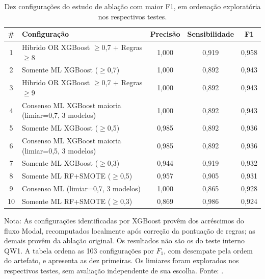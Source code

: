 \begin{table}[htbp]
\centering
\caption{Dez configurações do estudo de ablação com maior F1, em ordenação exploratória nos respectivos testes.}
\label{tab:ablation-top10}
\small
\begin{tabular}{cp{8cm}ccc}
\toprule
\# & Configuração & Precisão & Sensibilidade & F1 \\
\midrule
1 & Híbrido OR XGBoost $\geq$0,7 + Regras$\geq$8 & 1,000 & 0,919 & 0,958 \\
2 & Somente ML XGBoost ($\geq$0,7) & 1,000 & 0,892 & 0,943 \\
3 & Híbrido OR XGBoost $\geq$0,7 + Regras$\geq$9 & 1,000 & 0,892 & 0,943 \\
4 & Consenso ML XGBoost maioria (limiar=0,7, 3 modelos) & 1,000 & 0,892 & 0,943 \\
5 & Somente ML XGBoost ($\geq$0,5) & 0,985 & 0,892 & 0,936 \\
6 & Consenso ML XGBoost maioria (limiar=0,5, 3 modelos) & 0,985 & 0,892 & 0,936 \\
7 & Somente ML XGBoost ($\geq$0,3) & 0,944 & 0,919 & 0,932 \\
8 & Somente ML RF+SMOTE ($\geq$0,5) & 0,957 & 0,905 & 0,931 \\
9 & Consenso ML (limiar=0,7, 3 modelos) & 1,000 & 0,865 & 0,928 \\
10 & Somente ML RF+SMOTE ($\geq$0,3) & 0,869 & 0,986 & 0,924 \\
\bottomrule
\end{tabular}
\vspace{2pt}
\par\small Nota: As configurações identificadas por XGBoost provêm dos acréscimos do fluxo Modal, recomputados localmente após correção da pontuação de regras; as demais provêm da ablação original. Os resultados não são os do teste interno QW1. A tabela ordena as 103 configurações por $F_1$, com desempate pela ordem do artefato, e apresenta as dez primeiras. Os limiares foram explorados nos respectivos testes, sem avaliação independente de sua escolha. Fonte: .
\end{table}
